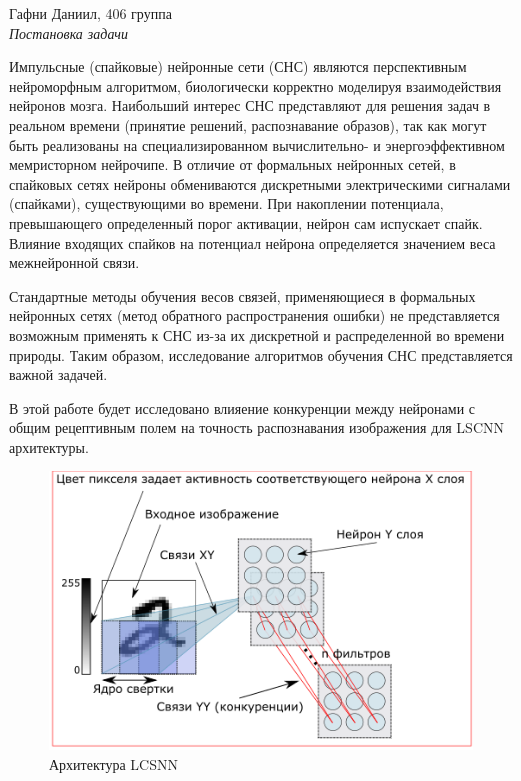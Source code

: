 \documentclass[a4paper]{article}
\begin{document}
\begin{center}
 Гафни Даниил, 406 группа\\
 \textit{Постановка задачи}
\end{center}

Импульсные (спайковые) нейронные сети (СНС) являются перспективным нейроморфным алгоритмом, биологически корректно моделируя взаимодействия нейронов мозга. Наибольший интерес СНС представляют для решения задач в реальном времени (принятие решений, распознавание образов), так как могут быть реализованы на специализированном вычислительно- и энергоэффективном мемристорном нейрочипе. В отличие от формальных нейронных сетей, в спайковых сетях нейроны обмениваются дискретными электрическими сигналами (спайками), существующими во времени. При накоплении потенциала, превышающего определенный порог активации, нейрон сам испускает спайк. Влияние входящих спайков на потенциал нейрона определяется значением веса межнейронной связи.

Стандартные методы обучения весов связей, применяющиеся в формальных нейронных сетях (метод обратного распространения ошибки) не представляется возможным применять к СНС из-за их дискретной и распределенной во времени природы. Таким образом, исследование алгоритмов обучения СНС представляется важной задачей.

В этой работе будет исследовано влияение конкуренции между нейронами с общим рецептивным полем на точность распознавания изображения для LSCNN архитектуры.

\begin{figure}[b!]
 \includegraphics{LCSNN.png}
 \caption{Архитектура LCSNN}
 \label{Изображение 1: Архитектура LCSNN}
\end{figure}
\end{document}
